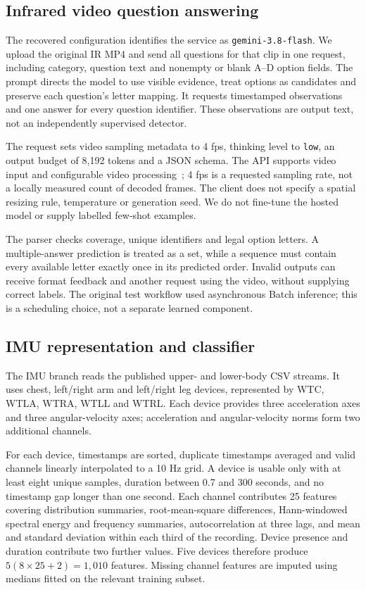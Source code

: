\documentclass[12pt,a4paper]{article}
\begin{document}
\subsection{Infrared video question answering}
The recovered configuration identifies the service as \texttt{gemini-3.8-flash}. We upload the original IR MP4 and send all questions for that clip in one request, including category, question text and nonempty or blank A--D option fields. The prompt directs the model to use visible evidence, treat options as candidates and preserve each question's letter mapping. It requests timestamped observations and one answer for every question identifier. These observations are output text, not an independently supervised detector.

The request sets video sampling metadata to 4 fps, thinking level to \texttt{low}, an output budget of 8,192 tokens and a JSON schema. The API supports video input and configurable video processing~\cite{gemini}; 4 fps is a requested sampling rate, not a locally measured count of decoded frames. The client does not specify a spatial resizing rule, temperature or generation seed. We do not fine-tune the hosted model or supply labelled few-shot examples.

The parser checks coverage, unique identifiers and legal option letters. A multiple-answer prediction is treated as a set, while a sequence must contain every available letter exactly once in its predicted order. Invalid outputs can receive format feedback and another request using the video, without supplying correct labels. The original test workflow used asynchronous Batch inference; this is a scheduling choice, not a separate learned component.

\subsection{IMU representation and classifier}
The IMU branch reads the published upper- and lower-body CSV streams. It uses chest, left/right arm and left/right leg devices, represented by WTC, WTLA, WTRA, WTLL and WTRL. Each device provides three acceleration axes and three angular-velocity axes; acceleration and angular-velocity norms form two additional channels.

For each device, timestamps are sorted, duplicate timestamps averaged and valid channels linearly interpolated to a 10 Hz grid. A device is usable only with at least eight unique samples, duration between 0.7 and 300 seconds, and no timestamp gap longer than one second. Each channel contributes 25 features covering distribution summaries, root-mean-square differences, Hann-windowed spectral energy and frequency summaries, autocorrelation at three lags, and mean and standard deviation within each third of the recording. Device presence and duration contribute two further values. Five devices therefore produce $5(8\times25+2)=1{,}010$ features. Missing channel features are imputed using medians fitted on the relevant training subset.
\end{document}
